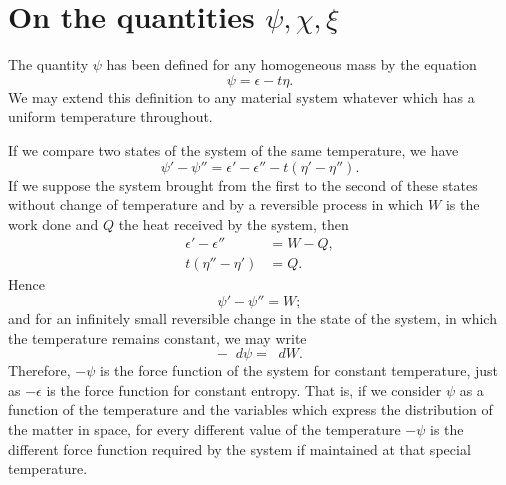 \documentclass[11pt]{article}
\newcommand{\dd}{\mathop{}\!d}
\newcommand{\eps}{\epsilon}
\begin{document}
\section*{On the quantities \(\psi,\chi,\xi\)}

The quantity \(\psi\) has been defined for any homogeneous mass by the equation
\begin{equation}
\psi=\eps-t\eta.
\end{equation}
We may extend this definition to any material system whatever which has a uniform temperature throughout.

If we compare two states of the system of the same temperature, we have
\begin{equation}
\psi'-\psi''=\eps'-\eps''-t(\eta'-\eta'').
\end{equation}
If we suppose the system brought from the first to the second of these states without change of temperature and by a reversible process in which \(W\) is the work done and \(Q\) the heat received by the system, then
\begin{align}
\eps'-\eps''&=W-Q,\\
t(\eta''-\eta')&=Q.
\end{align}
Hence
\begin{equation}
\psi'-\psi''=W;
\end{equation}
and for an infinitely small reversible change in the state of the system, in which the temperature remains constant, we may write
\begin{equation}
-\dd\psi=\dd W.
\end{equation}
Therefore, \(-\psi\) is the force function of the system for constant temperature, just as \(-\eps\) is the force function for constant entropy. That is, if we consider \(\psi\) as a function of the temperature and the variables which express the distribution of the matter in space, for every different value of the temperature \(-\psi\) is the different force function required by the system if maintained at that special temperature.
\end{document}
